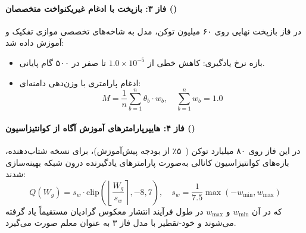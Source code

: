 \paragraph*{فاز ۳: بازپخت با ادغام غیریکنواخت متخصصان ()}
در فاز بازپخت نهایی روی ۶۰ میلیون توکن، مدل به شاخه‌های تخصصی موازی تفکیک و آموزش داده شد:
\begin{itemize}
    \item بازه نرخ یادگیری: کاهش خطی از $1.0 \times 10^{-5}$ تا صفر در ۵۰۰ گام پایانی.
    \item ادغام پارامتری با وزن‌دهی دامنه‌ای:
    \begin{equation}
        M = \frac{1}{n} \sum_{b=1}^n \theta_b \cdot w_b, \quad \sum_{b=1}^n w_b = 1.0
    \end{equation}
\end{itemize}

\paragraph*{فاز ۴: هایپرپارامترهای آموزش آگاه از کوانتیزاسیون ()}
در این فاز روی ۸۰ میلیارد توکن (~۵٪ از بودجه پیش‌آموزش)، برای نسخه شتاب‌دهنده، بازه‌های کوانتیزاسیون کانالی به‌صورت پارامترهای یادگیرنده درون شبکه بهینه‌سازی شدند:
\begin{equation}
    Q(W_g) = s_w \cdot \text{clip}\left( \left\lfloor \frac{W_g}{s_w} \right\rceil, -8, 7 \right), \quad s_w = \frac{1}{7.5} \max(-w_{\min}, w_{\max})
\end{equation}
که در آن $w_{\min}$ و $w_{\max}$ در طول فرآیند انتشار معکوس گرادیان مستقیماً یاد گرفته می‌شوند و خود-تقطیر با مدل فاز ۳ به عنوان معلم صورت می‌گیرد.

